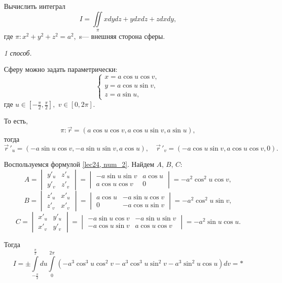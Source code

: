 \documentclass[../../main.tex]{subfiles}
\begin{document}
\begin{example}
	Вычислить интеграл \[I = \iint\limits_\pi xdydz + ydxdz + zdxdy,\] где $\pi:
	 x^2 + y^2 + z^2 = a^2$,~s--- внешняя сторона сферы.
	\smallskip
	
	\noindent\emph{1 способ.}
		
	Сферу можно задать параметрически:
	\[\begin{cases}	x = a \cos u \cos v,\\
		y = a \cos u \sin v,\\
		z = a \sin u,
	\end{cases}\]
	где $u \in [-\frac{\pi}{2}, \frac{\pi}{2}],$ $v \in [0, 2\pi].$
	
	То есть, \[\pi: \vec{r} = ( a \cos u \cos v,  a \cos u \sin v, a \sin u),\] 
	тогда \[\vec r\,'_u = (-a \sin u \cos v, -a \sin u \sin v, a \cos u),\quad
	 \vec r\,'_v = (-a \cos u \sin v, a \cos u \cos v, 0).\]
	
	Воспользуемся формулой \eqref{lec24, num_2}. Найдем $A$, $B$, $C$: 
	\[A=\begin{vmatrix}
	y'_u & z'_u\\
	y'_v & z'_v
	\end{vmatrix} = \begin{vmatrix}
	-a \sin u \sin v & a \cos u\\
	 a \cos u \cos v & 0
	\end{vmatrix} = -a^2 \cos^2 u \cos v,\] \[B=\begin{vmatrix}
	z'_u & x'_u\\
	z'_v & x'_v
	\end{vmatrix} = \begin{vmatrix}
	a \cos u & -a \sin u \cos v\\
	0 & -a \cos u \sin v
	\end{vmatrix} = -a^2 \cos^2 u \sin v,\]
	\begin{equation}C=\begin{vmatrix}
	x'_u & y'_u\\
	x'_v & y'_v
	\end{vmatrix} = \begin{vmatrix}
	-a \sin u \cos v & -a \sin u \sin v\\
	-a \cos u \sin v & a \cos u \cos v
	\end{vmatrix} = -a^2 \sin u \cos u.
	\label{lec24, num_2.5}
	\end{equation}
	
	Тогда \[I = \pm\int\limits_{-\frac{\pi}{2}}^{\frac{\pi}{2}}du\int\limits_0^
	{2\pi}(-a^3\cos^3 u \cos^2 v - a^3\cos^3 u \sin^2 v - a^3\sin^2 u \cos u)dv
	 = *\]
	

\end{example}
\end{document}
